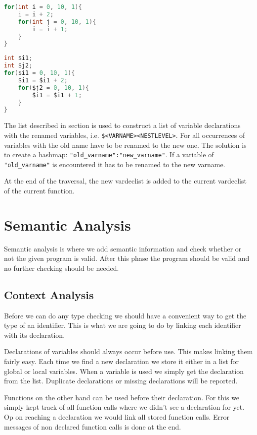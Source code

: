 \documentclass[a4paper]{article}
\begin{document}
\begin{lstlisting}[language=C]
for(int i = 0, 10, 1){
    i = i + 2;
    for(int j = 0, 10, 1){
        i = i + 1;
    }
}
\end{lstlisting}
\begin{lstlisting}[language=C]
int $i1;
int $j2;
for($i1 = 0, 10, 1){
    $i1 = $i1 + 2;
    for($j2 = 0, 10, 1){
        $i1 = $i1 + 1;
    }
}
\end{lstlisting}

The list described in section %
is used to construct a list of variable declarations with the renamed
variables, i.e. \texttt{\$<VARNAME><NESTLEVEL>}. For all occurrences of variables with
the old name have to be renamed to the new one. The solution is to create a
hashmap: \texttt{"old\_varname":"new\_varname"}. If a variable of
\texttt{"old\_varname"} is encountered it has to be renamed to the new varname.

At the end of the traversal, the new vardeclist is added to the current
vardeclist of the current function.

\section{Semantic Analysis}
Semantic analysis is where we add semantic information and check whether or not
the given program is valid. After this phase the program should be valid and no
further checking should be needed.

\subsection{Context Analysis}
Before we can do any type checking we should have a convenient way to get the
type of an identifier. This is what we are going to do by linking each
identifier with its declaration.

Declarations of variables should always occur before use. This makes linking
them fairly easy. Each time we find a new declaration we store it either in a list
for global or local variables. When a variable is used we simply get the
declaration from the list. Duplicate declarations or missing declarations will
be reported.

Functions on the other hand can be used before their declaration. For this we
simply kept track of all function calls where we didn't see a declaration for
yet. Op on reaching a declaration we would link all stored function calls. Error
messages of non declared function calls is done at the end.
\end{document}
